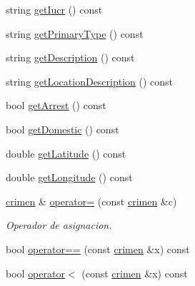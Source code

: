 \begin{DoxyCompactItemize}
string \hyperlink{classcrimen_a6d2bac20ef41f8c9944ca7deb8cc2ed5}{get\+Iucr} () const 
\item 
string \hyperlink{classcrimen_ae47e93acec39b388cde221a679bccf9c}{get\+Primary\+Type} () const 
\item 
string \hyperlink{classcrimen_a61789d65209d167149df197272d8feba}{get\+Description} () const 
\item 
string \hyperlink{classcrimen_a9de655b3eea3592f6e5d017e83fd6060}{get\+Location\+Description} () const 
\item 
bool \hyperlink{classcrimen_a6cab67bfdad566ce444236fc7c8df312}{get\+Arrest} () const 
\item 
bool \hyperlink{classcrimen_a1849e7a82111773a6919318b9cf1d05d}{get\+Domestic} () const 
\item 
double \hyperlink{classcrimen_adfd62cd48c7d1d0259c007d3f6c39d58}{get\+Latitude} () const 
\item 
double \hyperlink{classcrimen_a0c24726cd34dc975b3fc7c664287a15c}{get\+Longitude} () const 
\item 
\hyperlink{classcrimen}{crimen} \& \hyperlink{classcrimen_a675f3a6e34bf43e20613a96b93cbb407}{operator=} (const \hyperlink{classcrimen}{crimen} \&c)
\begin{DoxyCompactList}\small\item\em Operador de asignacion. \end{DoxyCompactList}\item 
bool \hyperlink{classcrimen_aeced9ce4b7486123412975b8884d1ab7}{operator==} (const \hyperlink{classcrimen}{crimen} \&x) const 
\item 
bool \hyperlink{classcrimen_ac865fdb9712f2426d947b1b5546b50e5}{operator$<$} (const \hyperlink{classcrimen}{crimen} \&x) const 
\end{DoxyCompactItemize}
